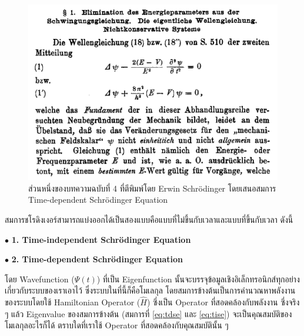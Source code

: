 \begin{figure}[htbp]
    \centering
    \includegraphics[width=0.8\linewidth]{fig/time-dep-schrodinger-eq.png}
    \caption{ส่วนหนึ่งของบทความฉบับที่ 4 ที่ตีพิมพ์โดย Erwin Schr\"{o}dinger โดยเสนอสมการ Time-dependent Schr\"{o}dinger 
    Equation}
    \label{fig:schrodinger_paper_4}
\end{figure}

สมการชโรดิงเงอร์สามารถแบ่งออกได้เป็นสองแบบคือแบบที่ไม่ขึ้นกับเวลาและแบบที่ขึ้นกับเวลา ดังนี้

\noindent $\bullet$ \textbf{1. Time-independent Schr\"{o}dinger Equation}


\noindent $\bullet$ \textbf{2. Time-dependent Schr\"{o}dinger Equation}


โดย Wavefunction ($\Psi(t)$) ที่เป็น Eigenfunction นั้นจะบรรจุข้อมูลเชิงอิเล็กทรอนิกส์ทุกอย่างเกี่ยวกับระบบของเราเอาไว้%
\autocite{szabo1996,cramer2004,jensen2017} ซึ่งระบบในที่นี้ก็คือโมเลกุล โดยสมการข้างต้นเป็นการคำนวณหาพลังงานของระบบโดยใช้ 
Hamiltonian Operator ($\hat{H}$) ซึ่งเป็น Operator ที่สอดคล้องกับพลังงาน ซึ่งจริง ๆ แล้ว Eigenvalue ของสมการข้างต้น (สมการที่ 
\ref{eq:tdse} และ \ref{eq:tise}) จะเป็นคุณสมบัติของโมเลกุลอะไรก็ได้ ตราบใดที่เราใช้ Operator ที่สอดคล้องกับคุณสมบัตินั้น ๆ 

